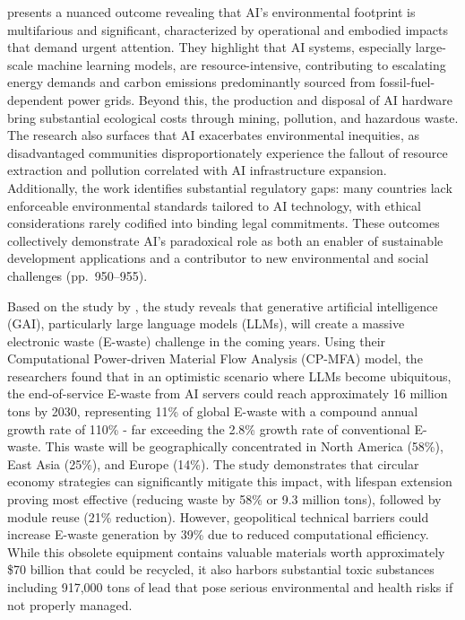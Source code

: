 \documentclass[a4paper, 12pt]{article}
\begin{document}
\par \citet{Zhuk2023} presents a nuanced outcome revealing that AI's environmental footprint is multifarious and significant, characterized by operational and embodied impacts that demand urgent attention. They highlight that AI systems, especially large-scale machine learning models, are resource-intensive, contributing to escalating energy demands and carbon emissions predominantly sourced from fossil-fuel-dependent power grids. Beyond this, the production and disposal of AI hardware bring substantial ecological costs through mining, pollution, and hazardous waste. The research also surfaces that AI exacerbates environmental inequities, as disadvantaged communities disproportionately experience the fallout of resource extraction and pollution correlated with AI infrastructure expansion. Additionally, the work identifies substantial regulatory gaps: many countries lack enforceable environmental standards tailored to AI technology, with ethical considerations rarely codified into binding legal commitments. These outcomes collectively demonstrate AI's paradoxical role as both an enabler of sustainable development applications and a contributor to new environmental and social challenges (pp.~950--955). \hfill \break
\par Based on the study by \citet{wang_2024_ewaste}, the study reveals that generative artificial intelligence (GAI), particularly large language models (LLMs), will create a massive electronic waste (E-waste) challenge in the coming years. Using their Computational Power-driven Material Flow Analysis (CP-MFA) model, the researchers found that in an optimistic scenario where LLMs become ubiquitous, the end-of-service E-waste from AI servers could reach approximately 16 million tons by 2030, representing 11\% of global E-waste with a compound annual growth rate of 110\% - far exceeding the 2.8\% growth rate of conventional E-waste. This waste will be geographically concentrated in North America (58\%), East Asia (25\%), and Europe (14\%). The study demonstrates that circular economy strategies can significantly mitigate this impact, with lifespan extension proving most effective (reducing waste by 58\% or 9.3 million tons), followed by module reuse (21\% reduction). However, geopolitical technical barriers could increase E-waste generation by 39\% due to reduced computational efficiency. While this obsolete equipment contains valuable materials worth approximately \$70 billion that could be recycled, it also harbors substantial toxic substances including 917,000 tons of lead that pose serious environmental and health risks if not properly managed.\hfill \break 
\end{document}
